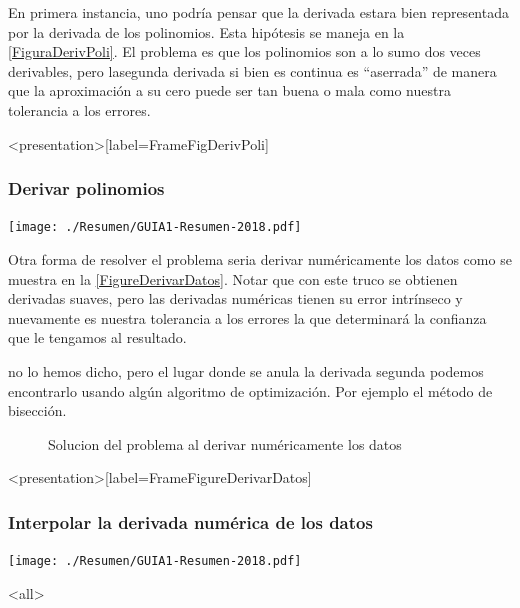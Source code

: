 En primera instancia, uno podría pensar que la derivada estara bien
representada por la derivada de los polinomios. Esta hipótesis se 
maneja en la \autoref{FiguraDerivPoli}. El problema es que los
polinomios son a lo sumo dos veces derivables, pero lasegunda derivada
si bien es continua es ``aserrada'' de manera que la aproximación
a su cero puede ser tan buena o mala como nuestra tolerancia a
los errores.

\begin{figure}
  \caption{\protect\label{FiguraDerivPoli}}
\end{figure}

\mode*
\begin{frame}<presentation>[label=FrameFigDerivPoli]
  \frametitle{Derivar polinomios}
  \center
  \texttt{[image: ./Resumen/GUIA1-Resumen-2018.pdf]}

\end{frame}

Otra forma de resolver el problema seria derivar numéricamente los datos
como  se muestra en la \autoref{FigureDerivarDatos}. Notar que con 
este truco se obtienen derivadas suaves, pero las derivadas 
numéricas tienen su error intrínseco y nuevamente es nuestra
tolerancia a los errores la que determinará la confianza que le 
tengamos al resultado. 

no lo hemos dicho, pero el lugar donde se anula la derivada 
segunda podemos encontrarlo usando algún algoritmo 
de optimización. Por ejemplo el método de bisección. 

\begin{figure}
  \caption{\protect\label{FigureDerivarDatos} Solucion del problema al
  derivar numéricamente los datos}
\end{figure}

\mode*
\begin{frame}<presentation>[label=FrameFigureDerivarDatos]
  \frametitle{Interpolar la derivada numérica de los datos}
  \center
  \texttt{[image: ./Resumen/GUIA1-Resumen-2018.pdf]}
\end{frame}

\mode*
 
\mode<all>

